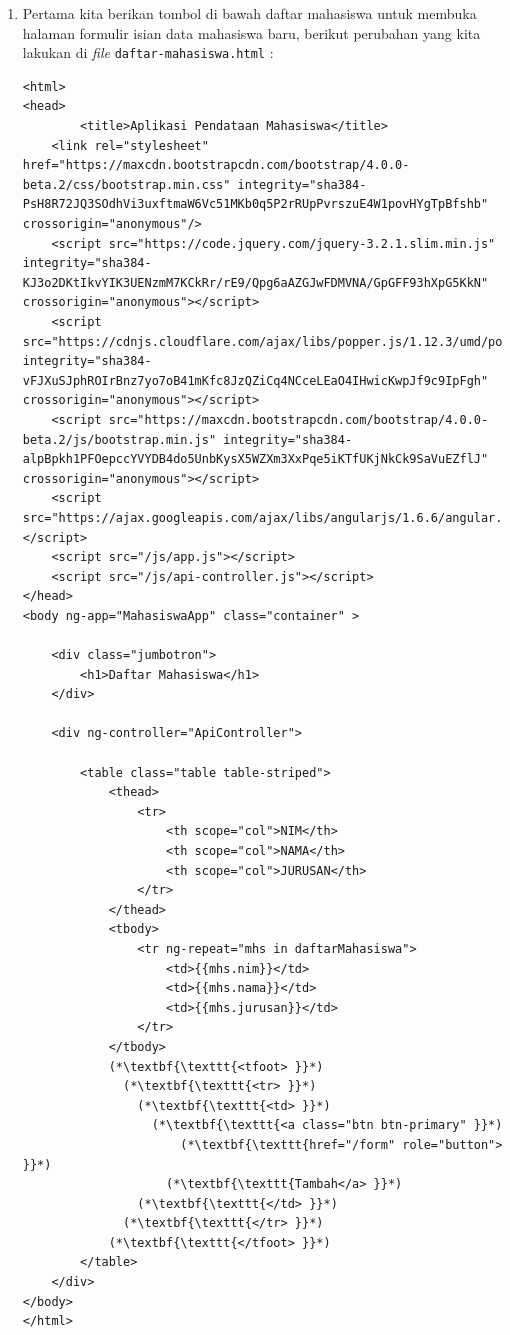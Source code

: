 \begin{enumerate}

	\item Pertama kita berikan tombol di bawah daftar mahasiswa untuk membuka halaman formulir isian data mahasiswa baru, berikut perubahan yang kita lakukan di \textit{file} \texttt{daftar-mahasiswa.html} :

\begin{lstlisting}
<html>
<head>
        <title>Aplikasi Pendataan Mahasiswa</title>
    <link rel="stylesheet" href="https://maxcdn.bootstrapcdn.com/bootstrap/4.0.0-beta.2/css/bootstrap.min.css" integrity="sha384-PsH8R72JQ3SOdhVi3uxftmaW6Vc51MKb0q5P2rRUpPvrszuE4W1povHYgTpBfshb" crossorigin="anonymous"/>
    <script src="https://code.jquery.com/jquery-3.2.1.slim.min.js" integrity="sha384-KJ3o2DKtIkvYIK3UENzmM7KCkRr/rE9/Qpg6aAZGJwFDMVNA/GpGFF93hXpG5KkN" crossorigin="anonymous"></script>
    <script src="https://cdnjs.cloudflare.com/ajax/libs/popper.js/1.12.3/umd/popper.min.js" integrity="sha384-vFJXuSJphROIrBnz7yo7oB41mKfc8JzQZiCq4NCceLEaO4IHwicKwpJf9c9IpFgh" crossorigin="anonymous"></script>
    <script src="https://maxcdn.bootstrapcdn.com/bootstrap/4.0.0-beta.2/js/bootstrap.min.js" integrity="sha384-alpBpkh1PFOepccYVYDB4do5UnbKysX5WZXm3XxPqe5iKTfUKjNkCk9SaVuEZflJ" crossorigin="anonymous"></script>
    <script src="https://ajax.googleapis.com/ajax/libs/angularjs/1.6.6/angular.min.js"></script>
    <script src="/js/app.js"></script>
    <script src="/js/api-controller.js"></script>
</head>
<body ng-app="MahasiswaApp" class="container" >

    <div class="jumbotron">
        <h1>Daftar Mahasiswa</h1>
    </div>

    <div ng-controller="ApiController">

        <table class="table table-striped">
            <thead>
                <tr>
                    <th scope="col">NIM</th>
                    <th scope="col">NAMA</th>
                    <th scope="col">JURUSAN</th>
                </tr>
            </thead>
            <tbody>
                <tr ng-repeat="mhs in daftarMahasiswa">
                    <td>{{mhs.nim}}</td>
                    <td>{{mhs.nama}}</td>
                    <td>{{mhs.jurusan}}</td>
                </tr>
            </tbody>            
            (*\textbf{\texttt{<tfoot> }}*)
              (*\textbf{\texttt{<tr> }}*)
                (*\textbf{\texttt{<td> }}*)
                  (*\textbf{\texttt{<a class="btn btn-primary" }}*)
                      (*\textbf{\texttt{href="/form" role="button"> }}*)
                    (*\textbf{\texttt{Tambah</a> }}*)
                (*\textbf{\texttt{</td> }}*)
              (*\textbf{\texttt{</tr> }}*)
            (*\textbf{\texttt{</tfoot> }}*)
        </table>
    </div>
</body>
</html>
\end{lstlisting}


\end{enumerate}

